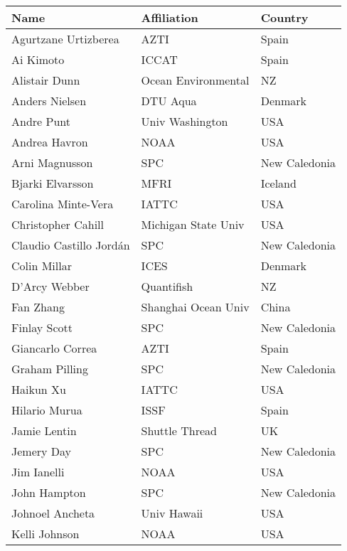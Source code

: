 \documentclass{SCreport}
\newcommand\I[1]{\rule{0pt}{#1}}
\begin{document}
\begin{tabular}{lll}
  \hline
  Name                    & Affiliation          & Country\\
  \hline
  Agurtzane Urtizberea    & AZTI                 & Spain\I{2.8ex}\\
  Ai Kimoto               & ICCAT                & Spain\\
  Alistair Dunn           & Ocean Environmental  & NZ\\
  Anders Nielsen          & DTU Aqua             & Denmark\\
  Andre Punt              & Univ Washington      & USA\\
  Andrea Havron           & NOAA                 & USA\\
  Arni Magnusson          & SPC                  & New Caledonia\\
  Bjarki Elvarsson        & MFRI                 & Iceland\\
  Carolina Minte-Vera     & IATTC                & USA\\
  Christopher Cahill      & Michigan State Univ  & USA\\
  Claudio Castillo Jordán & SPC                  & New Caledonia\\
  Colin Millar            & ICES                 & Denmark\\
  D'Arcy Webber           & Quantifish           & NZ\\
  Fan Zhang               & Shanghai Ocean Univ  & China\\
  Finlay Scott            & SPC                  & New Caledonia\\
  Giancarlo Correa        & AZTI                 & Spain\\
  Graham Pilling          & SPC                  & New Caledonia\\
  Haikun Xu               & IATTC                & USA\\
  Hilario Murua           & ISSF                 & Spain\\
  Jamie Lentin            & Shuttle Thread       & UK\\
  Jemery Day              & SPC                  & New Caledonia\\
  Jim Ianelli             & NOAA                 & USA\\
  John Hampton            & SPC                  & New Caledonia\\
  Johnoel Ancheta         & Univ Hawaii          & USA\\
  Kelli Johnson           & NOAA                 & USA\\

\end{tabular}
\end{document}
